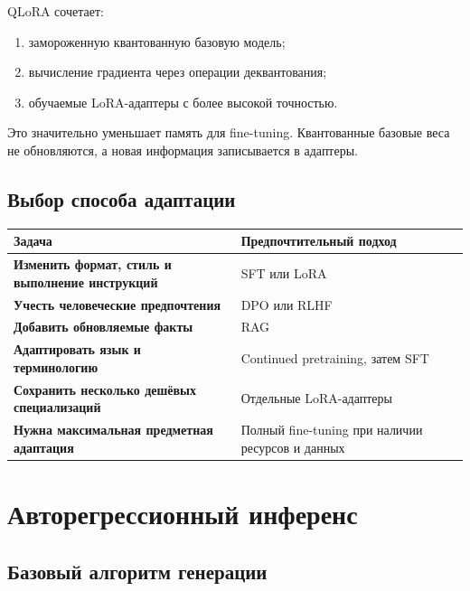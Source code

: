\documentclass[12pt,a4paper]{article}
\newcommand{\1}{\mathbf{1}}
\theoremstyle{definition}
\theoremstyle{remark}
\begin{document}
QLoRA сочетает:

\begin{enumerate}
    \item замороженную квантованную базовую модель;
    \item вычисление градиента через операции деквантования;
    \item обучаемые LoRA-адаптеры с более высокой точностью.
\end{enumerate}

Это значительно уменьшает память для fine-tuning. Квантованные базовые
веса не обновляются, а новая информация записывается в адаптеры.

\subsection{Выбор способа адаптации}

\begin{center}
\begin{tabularx}{\textwidth}{>{\bfseries}l X}
\toprule
Задача & Предпочтительный подход \\
\midrule
Изменить формат, стиль и выполнение инструкций
& SFT или LoRA
\\
Учесть человеческие предпочтения
& DPO или RLHF
\\
Добавить обновляемые факты
& RAG
\\
Адаптировать язык и терминологию
& Continued pretraining, затем SFT
\\
Сохранить несколько дешёвых специализаций
& Отдельные LoRA-адаптеры
\\
Нужна максимальная предметная адаптация
& Полный fine-tuning при наличии ресурсов и данных
\\
\bottomrule
\end{tabularx}
\end{center}

\section{Авторегрессионный инференс}

\subsection{Базовый алгоритм генерации}
\end{document}
